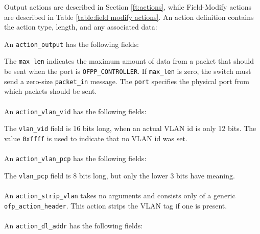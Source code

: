  
Output  actions are described in Section \ref{ft:actions}, while Field-Modify actions are described in Table \ref{table:field modify actions}.  An action definition contains the action type, length, and any associated data:


An \verb|action_output| has the following fields:


The \verb|max_len| indicates the maximum amount of data from a packet that should be sent when the port is \verb|OFPP_CONTROLLER|.  If \verb|max_len| is zero, the switch must send a zero-size \verb|packet_in| message.  The \verb|port| specifies the physical port from which packets should be sent. 
 \\\\
An \verb|action_vlan_vid| has the following fields:


The \verb|vlan_vid| field is 16 bits long, when an actual VLAN id is only 12 bits. The value \verb|0xffff| is used to indicate that no VLAN id was set.
\\\\
An \verb|action_vlan_pcp| has the following fields:


The \verb|vlan_pcp| field is 8 bits long, but only the lower 3 bits have meaning.  
\\\\
An \verb|action_strip_vlan| takes no arguments and consists only of a generic \verb|ofp_action_header|.  This action strips the VLAN tag if one is present.
\\\\
An \verb|action_dl_addr| has the following fields:

